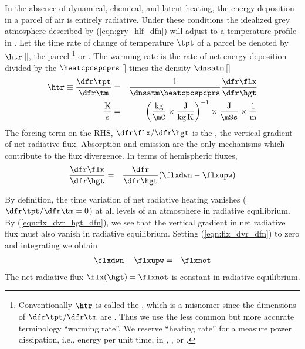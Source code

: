 \documentclass[12pt]{article}
\begin{document}
In the absence of dynamical, chemical, and latent heating, the energy
deposition in a parcel of air is entirely radiative.
Under these conditions the idealized grey atmosphere described by
(\ref{eqn:gry_hlf_dfn}) will adjust to a temperature profile
in .
Let the time rate of change of temperature $\tpt$ of a parcel be
denoted by $\htr$\,[\kxs], the parcel \footnote{%
Conventionally $\htr$ is called the , which is a
misnomer since the dimensions of $\dfr\tpt/\dfr\tm$ are \kxs.
Thus we use the less common but more accurate terminology ``warming rate''.
We reserve ``heating rate'' for a measure power dissipation, i.e.,
energy per unit time, in \jxs, \jxmCs, or \jxkgs.} or . 
The warming rate is the rate of net energy deposition divided by the
$\heatcpcspcprs$\,[\jxkgK] times the density $\dnsatm$\,[\kgxmC]
\begin{eqnarray}
\htr \equiv \frac{\dfr\tpt}{\dfr\tm} & = & 
\frac{1}{\dnsatm \heatcpcspcprs} \frac{\dfr\flx}{\dfr\hgt} \\
\frac{\mbox{K}}{\mbox{s}} & = & 
\left( \frac{\mbox{kg}}{\mbox{\mC}} \times \frac{\mbox{J}}{\mbox{kg\,K}} \right)^{-1} 
\times \frac{\mbox{J}}{\mbox{\mSs}} \times \frac{1}{\mbox{m}} \nonumber
\label{eqn:flx_dvr_hgt_dfn}
\end{eqnarray}
The forcing term on the RHS, $\dfr\flx/\dfr\hgt$ is the 
, the vertical gradient of 
net radiative flux.
Absorption and emission are the only mechanisms which contribute to
the flux divergence.
In terms of hemispheric fluxes,
\begin{eqnarray}
\frac{\dfr\flx}{\dfr\hgt} & = & \frac{\dfr}{\dfr\hgt} (\flxdwn - \flxupw)
\label{eqn:flx_dvr_dfn}
\end{eqnarray}

By definition, the time variation of net radiative heating vanishes 
($\dfr\tpt/\dfr\tm = 0$) at all levels of an atmosphere in radiative
equilibrium. 
By (\ref{eqn:flx_dvr_hgt_dfn}), we see that the vertical gradient in 
net radiative flux must also vanish in radiative equilibrium.
Setting (\ref{eqn:flx_dvr_dfn}) to zero and integrating we obtain
\begin{eqnarray}
\flxdwn - \flxupw & = & \flxnot
\label{eqn:flx_dvr_cst}
\end{eqnarray}
The net radiative flux $\flx(\hgt) = \flxnot$ is constant in 
radiative equilibrium.
\end{document}
